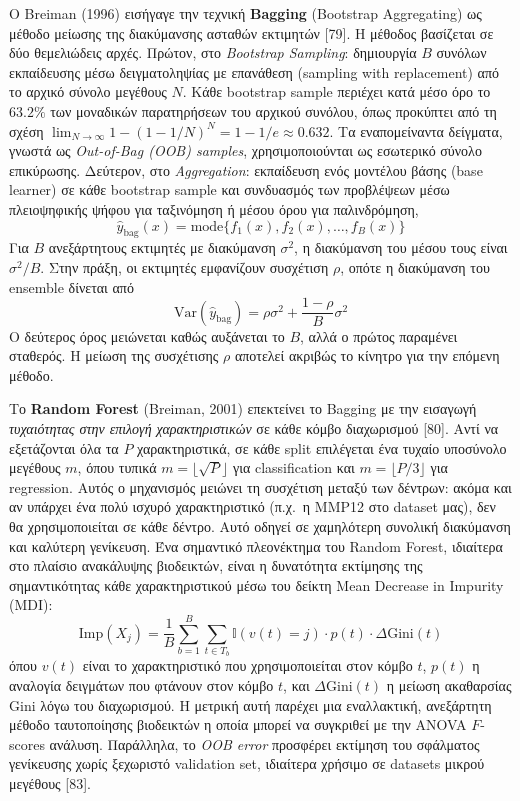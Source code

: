 Ο Breiman (1996) εισήγαγε την τεχνική \textbf{Bagging} (Bootstrap Aggregating) ως μέθοδο μείωσης της διακύμανσης ασταθών εκτιμητών [79]. Η μέθοδος βασίζεται σε δύο θεμελιώδεις αρχές. Πρώτον, στο \emph{Bootstrap Sampling}: δημιουργία $B$ συνόλων εκπαίδευσης μέσω δειγματοληψίας με επανάθεση (sampling with replacement) από το αρχικό σύνολο μεγέθους $N$. Κάθε bootstrap sample περιέχει κατά μέσο όρο το $63.2\%$ των μοναδικών παρατηρήσεων του αρχικού συνόλου, όπως προκύπτει από τη σχέση $\lim_{N \to \infty} 1 - (1 - 1/N)^N = 1 - 1/e \approx 0.632$. Τα εναπομείναντα δείγματα, γνωστά ως \emph{Out-of-Bag (OOB) samples}, χρησιμοποιούνται ως εσωτερικό σύνολο επικύρωσης. Δεύτερον, στο \emph{Aggregation}: εκπαίδευση ενός μοντέλου βάσης (base learner) σε κάθε bootstrap sample και συνδυασμός των προβλέψεων μέσω πλειοψηφικής ψήφου για ταξινόμηση ή μέσου όρου για παλινδρόμηση,
$$\hat{y}_{\text{bag}}(x) = \text{mode}\{f_1(x), f_2(x), \ldots, f_B(x)\}$$
Για $B$ ανεξάρτητους εκτιμητές με διακύμανση $\sigma^2$, η διακύμανση του μέσου τους είναι $\sigma^2 / B$. Στην πράξη, οι εκτιμητές εμφανίζουν συσχέτιση $\rho$, οπότε η διακύμανση του ensemble δίνεται από
$$\text{Var}(\hat{y}_{\text{bag}}) = \rho \sigma^2 + \frac{1 - \rho}{B} \sigma^2$$
Ο δεύτερος όρος μειώνεται καθώς αυξάνεται το $B$, αλλά ο πρώτος παραμένει σταθερός. Η μείωση της συσχέτισης $\rho$ αποτελεί ακριβώς το κίνητρο για την επόμενη μέθοδο.

Το \textbf{Random Forest} (Breiman, 2001) επεκτείνει το Bagging με την εισαγωγή \emph{τυχαιότητας στην επιλογή χαρακτηριστικών} σε κάθε κόμβο διαχωρισμού [80]. Αντί να εξετάζονται όλα τα $P$ χαρακτηριστικά, σε κάθε split επιλέγεται ένα τυχαίο υποσύνολο μεγέθους $m$, όπου τυπικά $m = \lfloor \sqrt{P} \rfloor$ για classification και $m = \lfloor P/3 \rfloor$ για regression. Αυτός ο μηχανισμός μειώνει τη συσχέτιση μεταξύ των δέντρων: ακόμα και αν υπάρχει ένα πολύ ισχυρό χαρακτηριστικό (π.χ.~η MMP12 στο dataset μας), δεν θα χρησιμοποιείται σε κάθε δέντρο. Αυτό οδηγεί σε χαμηλότερη συνολική διακύμανση και καλύτερη γενίκευση. Ένα σημαντικό πλεονέκτημα του Random Forest, ιδιαίτερα στο πλαίσιο ανακάλυψης βιοδεικτών, είναι η δυνατότητα εκτίμησης της σημαντικότητας κάθε χαρακτηριστικού μέσω του δείκτη Mean Decrease in Impurity (MDI):
$$\text{Imp}(X_j) = \frac{1}{B} \sum_{b=1}^{B} \sum_{t \in T_b} \mathbb{I}(v(t) = j) \cdot p(t) \cdot \Delta\text{Gini}(t)$$
όπου $v(t)$ είναι το χαρακτηριστικό που χρησιμοποιείται στον κόμβο $t$, $p(t)$ η αναλογία δειγμάτων που φτάνουν στον κόμβο $t$, και $\Delta\text{Gini}(t)$ η μείωση ακαθαρσίας Gini λόγω του διαχωρισμού. Η μετρική αυτή παρέχει μια εναλλακτική, ανεξάρτητη μέθοδο ταυτοποίησης βιοδεικτών η οποία μπορεί να συγκριθεί με την ANOVA $F$-scores ανάλυση. Παράλληλα, το \emph{OOB error} προσφέρει εκτίμηση του σφάλματος γενίκευσης χωρίς ξεχωριστό validation set, ιδιαίτερα χρήσιμο σε datasets μικρού μεγέθους [83].

